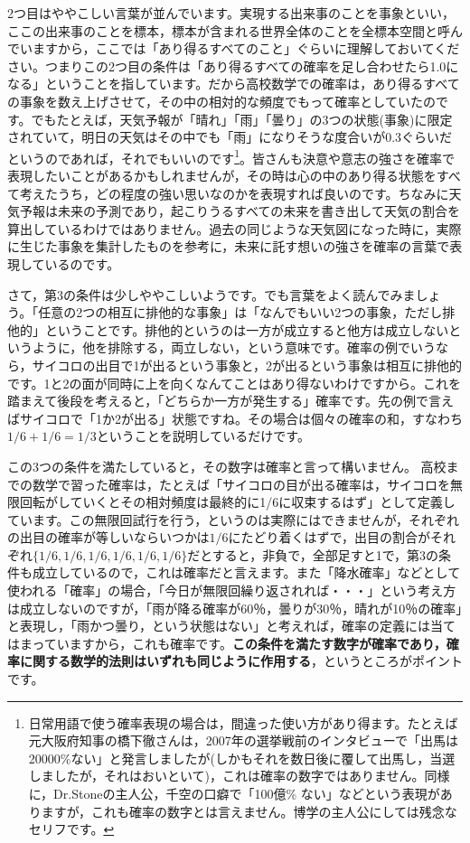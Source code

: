\documentclass{ltjbook}
\begin{document}
2つ目はややこしい言葉が並んでいます。実現する出来事のことを事象といい，ここの出来事のことを標本，標本が含まれる世界全体のことを全標本空間と呼んでいますから，ここでは「あり得るすべてのこと」ぐらいに理解しておいてください。つまりこの2つ目の条件は「あり得るすべての確率を足し合わせたら1.0になる」ということを指しています。だから高校数学での確率は，あり得るすべての事象を数え上げさせて，その中の相対的な頻度でもって確率としていたのです。でもたとえば，天気予報が「晴れ」「雨」「曇り」の3つの状態(事象)に限定されていて，明日の天気はその中でも「雨」になりそうな度合いが0.3ぐらいだというのであれば，それでもいいのです\footnote{日常用語で使う確率表現の場合は，間違った使い方があり得ます。たとえば元大阪府知事の橋下徹さんは，2007年の選挙戦前のインタビューで「出馬は20000\%ない」と発言しましたが(しかもそれを数日後に覆して出馬し，当選しましたが，それはおいといて)，これは確率の数字ではありません。同様に，Dr.Stoneの主人公，千空の口癖で「100億\% ない」などという表現がありますが，これも確率の数字とは言えません。博学の主人公にしては残念なセリフです。}。皆さんも決意や意志の強さを確率で表現したいことがあるかもしれませんが，その時は心の中のあり得る状態をすべて考えたうち，どの程度の強い思いなのかを表現すれば良いのです。ちなみに天気予報は未来の予測であり，起こりうるすべての未来を書き出して天気の割合を算出しているわけではありません。過去の同じような天気図になった時に，実際に生じた事象を集計したものを参考に，未来に託す想いの強さを確率の言葉で表現しているのです。

さて，第3の条件は少しややこしいようです。でも言葉をよく読んでみましょう。「任意の2つの相互に排他的な事象」は「なんでもいい2つの事象，ただし排他的」ということです。排他的というのは一方が成立すると他方は成立しないというように，他を排除する，両立しない，という意味です。確率の例でいうなら，サイコロの出目で1が出るという事象と，2が出るという事象は相互に排他的です。1と2の面が同時に上を向くなんてことはあり得ないわけですから。これを踏まえて後段を考えると，「どちらか一方が発生する」確率です。先の例で言えばサイコロで「1か2が出る」状態ですね。その場合は個々の確率の和，すなわち$1/6+1/6=1/3$ということを説明しているだけです。

この3つの条件を満たしていると，その数字は確率と言って構いません。
高校までの数学で習った確率は，たとえば「サイコロの目が出る確率は，サイコロを無限回転がしていくとその相対頻度は最終的に1/6に収束するはず」として定義しています。この無限回試行を行う，というのは実際にはできませんが，それぞれの出目の確率が等しいならいつかは$1/6$にたどり着くはずで，出目の割合がそれぞれ$\{ 1/6,1/6,1/6,1/6,1/6,1/6 \}$だとすると，非負で，全部足すと1で，第3の条件も成立しているので，これは確率だと言えます。また「降水確率」などとして使われる「確率」の場合，「今日が無限回繰り返されれば・・・」という考え方は成立しないのですが，「雨が降る確率が60％，曇りが30％，晴れが10％の確率」と表現し，「雨かつ曇り，という状態はない」と考えれば，確率の定義には当てはまっていますから，これも確率です。\textbf{この条件を満たす数字が確率であり，確率に関する数学的法則はいずれも同じように作用する}，というところがポイントです。
\end{document}
